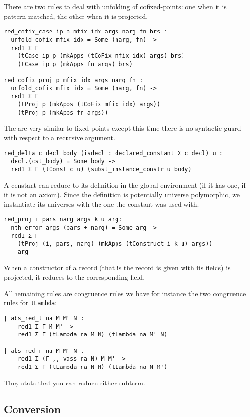 There are two rules to deal with unfolding of cofixed-points: one when it is
pattern-matched, the other when it is projected.
\begin{verbatim}
red_cofix_case ip p mfix idx args narg fn brs :
  unfold_cofix mfix idx = Some (narg, fn) ->
  red1 Σ Γ
    (tCase ip p (mkApps (tCoFix mfix idx) args) brs)
    (tCase ip p (mkApps fn args) brs)

red_cofix_proj p mfix idx args narg fn :
  unfold_cofix mfix idx = Some (narg, fn) ->
  red1 Σ Γ
    (tProj p (mkApps (tCoFix mfix idx) args))
    (tProj p (mkApps fn args))
\end{verbatim}
The are very similar to fixed-points except this time there is no syntactic
guard with respect to a recursive argument.

\begin{verbatim}
red_delta c decl body (isdecl : declared_constant Σ c decl) u :
  decl.(cst_body) = Some body ->
  red1 Σ Γ (tConst c u) (subst_instance_constr u body)
\end{verbatim}
A constant can reduce to its definition in the global environment (if it has
one, \ie if it is not an axiom). Since the definition is potentially universe
polymorphic, we instantiate its universes with the one the constant was used
with.

\begin{verbatim}
red_proj i pars narg args k u arg:
  nth_error args (pars + narg) = Some arg ->
  red1 Σ Γ
    (tProj (i, pars, narg) (mkApps (tConstruct i k u) args))
    arg
\end{verbatim}
When a constructor of a record (that is the record is given with its fields) is
projected, it reduces to the corresponding field.

All remaining rules are congruence rules we have for instance the two congruence
rules for \texttt{tLambda}:
\begin{verbatim}
| abs_red_l na M M' N :
    red1 Σ Γ M M' ->
    red1 Σ Γ (tLambda na M N) (tLambda na M' N)

| abs_red_r na M M' N :
    red1 Σ (Γ ,, vass na N) M M' ->
    red1 Σ Γ (tLambda na N M) (tLambda na N M')
\end{verbatim}
They state that you can reduce either subterm.

\subsection{Conversion}

